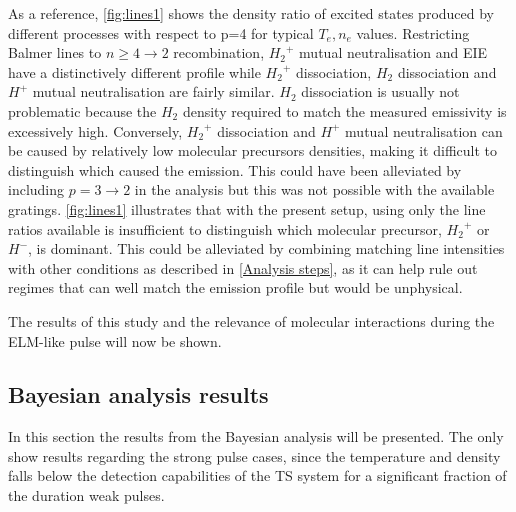 As a reference, \autoref{fig:lines1} shows the density ratio of excited states produced by different processes with respect to p=4 for typical $T_e,n_e$ values. %
Restricting Balmer lines to $n \geq 4 \rightarrow 2$ recombination, ${H_2}^+$ mutual neutralisation and EIE have a distinctively different profile while ${H_2}^+$ dissociation, $H_2$ dissociation and $H^+$ mutual neutralisation are fairly similar. $H_2$ dissociation is usually not problematic because the $H_2$ density required to match the measured emissivity is excessively high. Conversely, ${H_2}^+$ dissociation and $H^+$ mutual neutralisation can be caused by relatively low molecular precursors densities, making it difficult to distinguish which caused the emission. This could have been alleviated by including $p=3 \rightarrow 2$ in the analysis\cite{Verhaegh2021a} but this was not possible with the available gratings. \autoref{fig:lines1} illustrates that with the present setup, using only the line ratios available is insufficient to distinguish which molecular precursor, ${H_2}^+$ or $H^-$, is dominant. This could be alleviated by combining matching line intensities with other conditions as described in \autoref{Analysis steps}, as it can help rule out regimes that can well match the emission profile but would be unphysical.

The results of this study and the relevance of molecular interactions during the ELM-like pulse will now be shown.

\subsection{Bayesian analysis results}\label{Bayesian analysis results}
In this section the results from the Bayesian analysis will be presented. The only show results regarding the strong pulse cases, since the temperature and density falls below the detection capabilities of the TS system for a significant fraction of the duration weak pulses.

